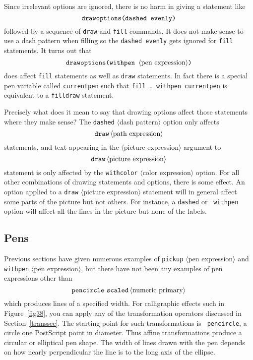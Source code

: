 \documentclass{article} %
\newcommand\descr[1]{{\langle\hbox{#1}\rangle}}
\newcommand\invisgap{\nobreak\hskip0pt\relax}
\newcommand\tdescr[1]{$\langle$\invisgap#1\invisgap$\rangle$}
\begin{document}
Since irrelevant options are ignored, there is no harm in giving a statement
like
$$ \hbox{\tt drawoptions(dashed evenly)} $$
followed by a sequence of {\tt draw} and {\tt fill} commands.  It does
not make sense to use a dash pattern when filling so the {\tt dashed
evenly} gets ignored for {\tt fill} statements.  It turns out that
$$ \hbox{\tt drawoptions(withpen } \descr{pen expression} \hbox{\tt )} $$
does affect {\tt fill} statements as well as {\tt draw} statements.
In fact there is a special pen variable called
{\tt currentpen} such that
{\tt fill} \ldots\ {\tt withpen currentpen} is equivalent to a {\tt filldraw}
statement.

Precisely what does it mean to say that drawing options affect those
statements where they make sense?  The {\tt dashed} \tdescr{dash
pattern} option only affects
$$ {\tt draw}\, \descr{path expression} $$
statements, and text appearing in the \tdescr{picture expression} argument to
$$ {\tt draw}\, \descr{picture expression} $$
statement is only affected by the {\tt withcolor} \tdescr{color
expression} option.  For all other combinations of drawing statements
and options, there is some effect.  An option applied to a {\tt draw}
\tdescr{picture expression} statement will in general affect some parts
of the picture but not others.  For instance, a {\tt dashed} or {\tt
withpen} option will affect all the lines in the picture but none of the
labels.


\subsection{Pens}
\label{sec.pens}

Previous sections have given numerous examples of {\tt pickup}
\tdescr{pen expression} and {\tt withpen} \tdescr{pen expression}, but
there have not been any examples of pen expressions other than
$$ {\tt pencircle\ scaled}\, \descr{numeric primary} $$
which produces lines of a specified width.  For calligraphic effects
such in Figure~\ref{fig38}, you can apply any of the transformation
operators discussed in Section~\ref{transsec}.  The starting point for
such transformations is {\tt
pencircle}\label{Dpncirc}, a circle
one PostScript point in diameter.  Thus affine transformations produce a
circular or elliptical pen shape.  The width of
lines drawn with the pen depends on how nearly perpendicular the line is
to the long axis of the ellipse.
\end{document}

